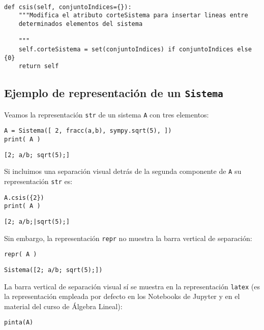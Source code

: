 \documentclass[11pt]{report}
\begin{document}
\begin{verbatim}

def csis(self, conjuntoIndices={}):
    """Modifica el atributo corteSistema para insertar lineas entre
    determinados elementos del sistema

    """
    self.corteSistema = set(conjuntoIndices) if conjuntoIndices else {0}
    return self

\end{verbatim}

\subsection{Ejemplo de representación de un \texttt{Sistema}}
\label{sec:org2bf76b8}
Veamos la representación \texttt{str} de un sistema \texttt{A} con tres elementos:

\begin{verbatim}
A = Sistema([ 2, fracc(a,b), sympy.sqrt(5), ])
print( A )
\end{verbatim}

\texttt{[2; a/b; sqrt(5);]}

Si incluimos una separación visual detrás de la segunda componente de
\texttt{A} su representación \texttt{str} es:

\begin{verbatim}
A.csis({2})
print( A )
\end{verbatim}

\texttt{[2; a/b;|sqrt(5);]}

Sin embargo, la representación \texttt{repr} no muestra la barra vertical de
separación:

\begin{verbatim}
repr( A )
\end{verbatim}

\texttt{Sistema([2; a/b; sqrt(5);])}

La barra vertical de separación visual sí se muestra en la
representación \texttt{latex} (es la representación empleada por defecto en
los Notebooks de Jupyter y en el material del curso de Álgebra
Lineal):

\begin{verbatim}
pinta(A)
\end{verbatim}
\end{document}
